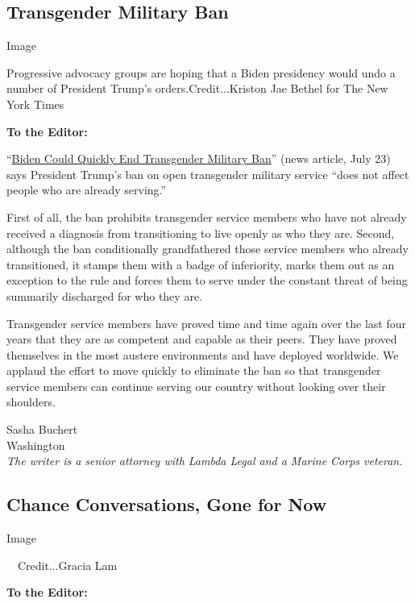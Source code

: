 \hypertarget{transgender-military-ban}{%
\subsection{Transgender Military Ban}\label{transgender-military-ban}}

Image

Progressive advocacy groups are hoping that a Biden presidency would
undo a number of President Trump's orders.Credit...Kriston Jae Bethel
for The New York Times

\textbf{To the Editor:}

``\href{https://www.nytimes.com/2020/07/22/us/politics/military-transgender-trump-biden.html}{Biden
Could Quickly End Transgender Military Ban}'' (news article, July 23)
says President Trump's ban on open transgender military service ``does
not affect people who are already serving.''

First of all, the ban prohibits transgender service members who have not
already received a diagnosis from transitioning to live openly as who
they are. Second, although the ban conditionally grandfathered those
service members who already transitioned, it stamps them with a badge of
inferiority, marks them out as an exception to the rule and forces them
to serve under the constant threat of being summarily discharged for who
they are.

Transgender service members have proved time and time again over the
last four years that they are as competent and capable as their peers.
They have proved themselves in the most austere environments and have
deployed worldwide. We applaud the effort to move quickly to eliminate
the ban so that transgender service members can continue serving our
country without looking over their shoulders.

Sasha Buchert\\
Washington\\
\emph{The writer is a senior attorney with Lambda Legal and a Marine
Corps veteran.}

\hypertarget{chance-conversations-gone-for-now}{%
\subsection{Chance Conversations, Gone for
Now}\label{chance-conversations-gone-for-now}}

Image

~~Credit...Gracia Lam

\textbf{To the Editor:}

